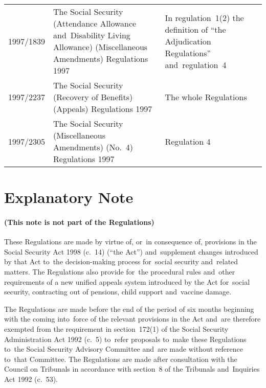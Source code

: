 \documentclass[12pt,a4paper]{article}
\begin{document}
{\begin{longtable}{p{50pt}p{188pt}p{116pt}}
1997/1839&The Social Security (Attendance Allowance and~Disability Living Allowance) (Miscellaneous Amendments) Regulations 1997&In regulation~1(2) the definition of “the Adjudication Regulations” and~regulation~4\\
1997/2237&The Social Security (Recovery of Benefits) (Appeals) Regulations 1997&The whole Regulations\\
1997/2305&The Social Security (Miscellaneous Amendments) (No.\ 4) Regulations 1997&Regulation 4\\
\end{longtable}

}


\part{Explanatory Note}

\renewcommand\parthead{--- Explanatory Note}

\subsection*{(This note is not part of the Regulations)}

 These Regulations are made by virtue of, or~in consequence of, provisions in the Social Security Act 1998 (c.\ 14) (“the Act”) and~supplement changes introduced by that Act to~the decision-making process for~social security and~related matters. The Regulations also provide for~the procedural rules and~other requirements of a new unified appeals system introduced by the Act for~social security, contracting out of pensions, child support and~vaccine damage.

  The Regulations are made before the end of the period of six months beginning with the coming into~force of the relevant provisions in the Act and~are therefore exempted from the requirement in section~172(1) of the Social Security Administration Act 1992 (c.~5) to~refer proposals to~make these Regulations to~the Social Security Advisory Committee and~are made without reference to~that Committee. The Regulations are made after consultation with the Council on Tribunals in accordance with section~8 of the Tribunals and~Inquiries Act 1992 (c.~53).
\end{document}
